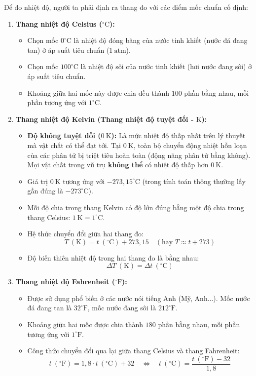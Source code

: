 \begin{kienthuc}
	Để đo nhiệt độ, người ta phải định ra thang đo với các điểm mốc chuẩn cố định:
	\begin{enumerate}
		\item \textbf{Thang nhiệt độ Celsius ($^\circ\mathrm{C}$):}
		\begin{itemize}
			\item Chọn mốc $0^\circ\mathrm{C}$ là nhiệt độ đóng băng của nước tinh khiết (nước đá đang tan) ở áp suất tiêu chuẩn ($1\ \mathrm{atm}$).
			\item Chọn mốc $100^\circ\mathrm{C}$ là nhiệt độ sôi của nước tinh khiết (hơi nước đang sôi) ở áp suất tiêu chuẩn.
			\item Khoảng giữa hai mốc này được chia đều thành $100$ phần bằng nhau, mỗi phần tương ứng với $1^\circ\mathrm{C}$.
		\end{itemize}
		\item \textbf{Thang nhiệt độ Kelvin (Thang nhiệt độ tuyệt đối - $\mathrm{K}$):}
		\begin{itemize}
			\item \textbf{Độ không tuyệt đối ($0\ \mathrm{K}$):} Là mức nhiệt độ thấp nhất trên lý thuyết mà vật chất có thể đạt tới. Tại $0\ \mathrm{K}$, toàn bộ chuyển động nhiệt hỗn loạn của các phân tử bị triệt tiêu hoàn toàn (động năng phân tử bằng không). Mọi vật chất trong vũ trụ \textbf{không thể} có nhiệt độ thấp hơn $0\ \mathrm{K}$.
			\item Giá trị $0\ \mathrm{K}$ tương ứng với $-273{,}15^\circ\mathrm{C}$ (trong tính toán thông thường lấy gần đúng là $-273^\circ\mathrm{C}$).
			\item Mỗi độ chia trong thang Kelvin có độ lớn đúng bằng một độ chia trong thang Celsius: $1\ \mathrm{K} = 1^\circ\mathrm{C}$.
			\item Hệ thức chuyển đổi giữa hai thang đo:
			\[
			T\ (\mathrm{K}) = t\ (^\circ\mathrm{C}) + 273{,}15 \quad (\text{hay } T \approx t + 273)
			\]
			\item Độ biến thiên nhiệt độ trong hai thang đo là bằng nhau:
			\[
			\Delta T\ (\mathrm{K}) = \Delta t\ (^\circ\mathrm{C})
			\]
		\end{itemize}
		\item \textbf{Thang nhiệt độ Fahrenheit ($^\circ\mathrm{F}$):}
		\begin{itemize}
			\item Được sử dụng phổ biến ở các nước nói tiếng Anh (Mỹ, Anh...). Mốc nước đá đang tan là $32^\circ\mathrm{F}$, mốc nước đang sôi là $212^\circ\mathrm{F}$.
			\item Khoảng giữa hai mốc được chia thành $180$ phần bằng nhau, mỗi phần tương ứng với $1^\circ\mathrm{F}$.
			\item Công thức chuyển đổi qua lại giữa thang Celsius và thang Fahrenheit:
			\[
			t\ (^\circ\mathrm{F}) = 1{,}8 \cdot t\ (^\circ\mathrm{C}) + 32 \quad \Longleftrightarrow \quad t\ (^\circ\mathrm{C}) = \dfrac{t\ (^\circ\mathrm{F}) - 32}{1{,}8}
			\]
		\end{itemize}
	\end{enumerate}
\end{kienthuc}

